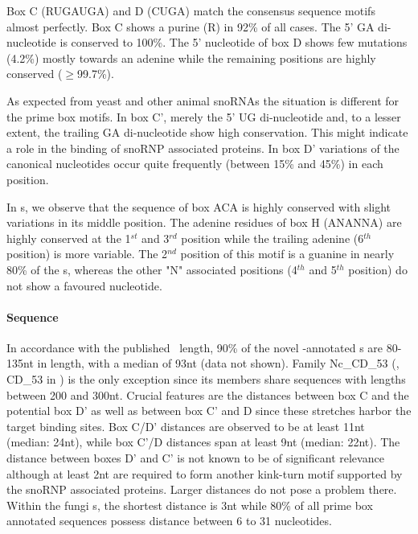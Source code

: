 Box C (RUGAUGA) and D (CUGA) match the consensus sequence motifs
almost perfectly. Box C shows a purine (R) in 92\% of all cases. 
The 5' GA di-nucleotide is conserved to 100\%. 
The 5' nucleotide  of box D
shows few mutations (4.2\%) mostly towards an adenine while the
remaining positions are highly conserved ($\ge$99.7\%). 

As expected from yeast and other animal snoRNAs the situation is different for the prime box motifs. 
In box C', merely the 5' UG di-nucleotide and, to a lesser extent, the
trailing GA di-nucleotide show high conservation.
This might indicate a role in the binding of snoRNP associated proteins.
In box D' variations of the canonical nucleotides occur quite
frequently (between 15\% and 45\%) in each position.

In \haca s, we observe that the sequence of box ACA is highly conserved with
slight variations in its middle position. The adenine residues of box H (ANANNA) are highly conserved at the 1$^{st}$ and
3$^{rd}$ position while the trailing adenine (6$^{th}$ position) is more variable. The
2$^{nd}$ position of this motif is a guanine in nearly 80\% of the \haca s, whereas the other "N" associated positions (4$^{th}$ and 5$^{th}$ position) do not show a favoured nucleotide.

\paragraph{\textbf{Sequence}}  In
accordance with the published \cd\ length, 90\% of the novel
\snostrip-annotated  \sno s are 80-135nt in length, with a median of 93nt (data not shown). 
Family Nc\_CD\_53 (\ncr, CD\_53 in \snostrip) is the only exception since its members share sequences with lengths between 200 and 300nt. 
Crucial features are the distances between box C
and the potential box D'  as well as between box C' and D
since these stretches harbor the target binding sites. 
Box C/D' distances are observed to be at least 11nt (median: 24nt), while box C'/D distances span at least 9nt (median: 22nt). 
The distance between boxes D' and C' is not known to be of significant relevance although at least 2nt are required to form another kink-turn motif supported by  the snoRNP associated proteins. 
Larger distances do not pose a problem there. 
Within the fungi \sno s, the shortest distance is 3nt while 80\% of all
prime box annotated sequences possess distance between 6 to 31
nucleotides.

